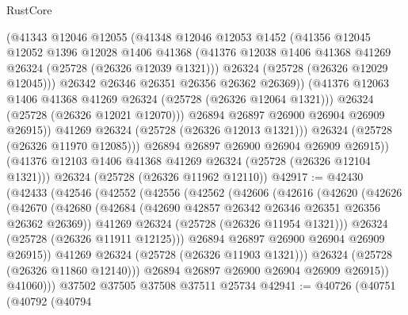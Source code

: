 \begin{lexlean}{RustCore}
\begin{coremodule}
                  (@41343
                    @12046
                    @12055
                    (@41348
                      @12046
                      @12053
                      @1452
                      (@41356
                        @12045
                        @12052
                        @1396
                        @12028
                        @1406
                        @41368
                        (@41376 @12038 @1406 @41368 @41269 @26324 (@25728 (@26326 @12039 @1321)))
                        @26324
                        (@25728 (@26326 @12029 @12045)))
                      @26342
                      @26346
                      @26351
                      @26356
                      @26362
                      @26369))
                  (@41376 @12063 @1406 @41368 @41269 @26324 (@25728 (@26326 @12064 @1321)))
                  @26324
                  (@25728 (@26326 @12021 @12070)))
                @26894
                @26897
                @26900
                @26904
                @26909
                @26915))
            @41269
            @26324
            (@25728 (@26326 @12013 @1321)))
          @26324
          (@25728 (@26326 @11970 @12085)))
        @26894
        @26897
        @26900
        @26904
        @26909
        @26915))
    (@41376 @12103 @1406 @41368 @41269 @26324 (@25728 (@26326 @12104 @1321)))
    @26324
    (@25728 (@26326 @11962 @12110))
@42917 := @42430
    (@42433
      (@42546
        (@42552
          (@42556
            (@42562
              (@42606
                (@42616
                  (@42620
                    (@42626
                      (@42670
                        (@42680
                          (@42684 (@42690 @42857 @26342 @26346 @26351 @26356 @26362 @26369))
                          @41269
                          @26324
                          (@25728 (@26326 @11954 @1321)))
                        @26324
                        (@25728 (@26326 @11911 @12125)))
                      @26894
                      @26897
                      @26900
                      @26904
                      @26909
                      @26915))
                  @41269
                  @26324
                  (@25728 (@26326 @11903 @1321)))
                @26324
                (@25728 (@26326 @11860 @12140)))
              @26894
              @26897
              @26900
              @26904
              @26909
              @26915))
          @41060)))
    @37502
    @37505
    @37508
    @37511
    @25734
@42941 := @40726
    (@40751
      (@40792
        (@40794

\end{coremodule}
\end{lexlean}
